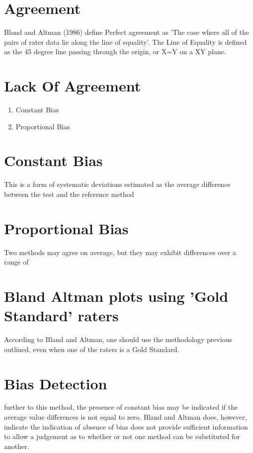 \documentclass[12pt, a4paper]{report}
\theoremstyle{plain}
\theoremstyle{definition}
\theoremstyle{remark}
\begin{document}
	\section{Agreement} Bland and Altman (1986) define Perfect
	agreement as 'The case where all of the pairs of rater data lie
	along the line of equality'. The Line of Equality is defined as
	the 45 degree line passing through the origin, or X=Y on a XY
	plane.
	
	\section{Lack Of Agreement}
	\begin{enumerate}
		\item Constant Bias\item Proportional Bias
	\end{enumerate}
	
	\section*{Constant Bias} This is a form of systematic
	deviations estimated as the average difference between the test
	and the reference method
	
	
	\section*{Proportional Bias} Two methods may agree on
	average, but they may exhibit differences over a range of

	\section{Bland Altman plots using 'Gold Standard' raters}
	According to Bland and Altman, one should use the methodology
	previous outlined, even when one of the raters is a Gold Standard.
	
	
	\section{Bias Detection}
	further to this method, the presence of constant bias may be
	indicated if the average value differences is not equal to zero.
	Bland and Altman does, however, indicate the indication of absence
	of bias does not provide sufficient information to allow a
	judgement as to whether or not one method can be substituted for
	another.
	
	
\end{document}
